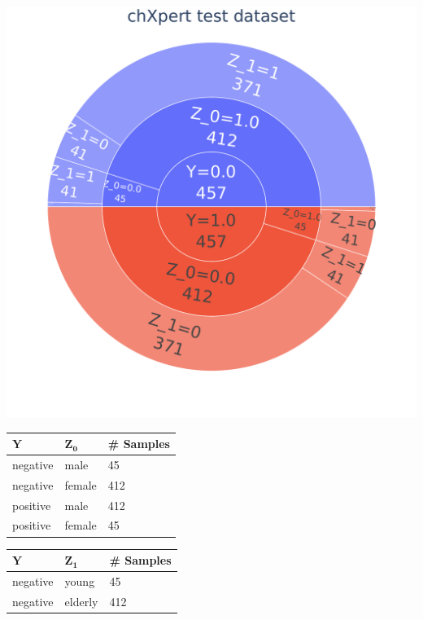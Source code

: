 \documentclass[12pt,DIV14,BCOR12mm,a4paper,footinclude=false,headinclude,parskip=half-,twoside,openright,cleardoublepage=empty,toc=index,bibliography=totoc,listof=totoc]{scrreprt}
\numberwithin{equation}{chapter}
\begin{document}
\begin{table}[H]
    \begin{minipage}[H]{\linewidth}
        \centering
        \begin{minipage}[H]{0.5\linewidth}
            \centering
            \includegraphics[width=0.8\linewidth]{thesis/figures/data_distribution_chXpert_test_dataset_3.pdf}
        \end{minipage}%
        \hfill
        \begin{minipage}[H]{0.5\linewidth}
            \centering
            \small
            \begin{tabular}{|p{1.25cm}|p{1.75cm}|p{2cm}|}
                \hline
                $\mathbf{Y}$ & $\mathbf{Z_0}$ & \# \textbf{Samples } \\
                \hline
                negative & male & 45 \\
                negative & female & 412\\
                positive & male & 412 \\
                positive & female & 45\\
                \hline
            \end{tabular}
            \begin{tabular}{|p{1.25cm}|p{1.75cm}|p{2cm}|}
                \hline
                $\mathbf{Y}$ & $\mathbf{Z_1}$ & \# \textbf{Samples } \\
                \hline
                negative & young & 45\\
                negative & elderly & 412\\

\end{tabular}
\end{minipage}
\end{minipage}
\end{table}
\end{document}
